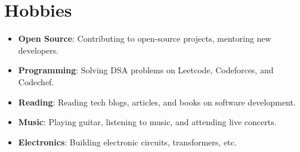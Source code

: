 \documentclass[letterpaper,1pt]{article}
\begin{document}
\section{Hobbies}
\begin{itemize}[leftmargin=*, itemsep=1pt, parsep=0pt]
      \selectfont\small
      \setlength\itemsep{0em}
      \setlength\parsep{0em}
      \item \textbf{Open Source}: \hspace{1.0cm}
            Contributing to open-source projects, mentoring new developers.
      \item \textbf{Programming}: \hspace{0.9cm}
            Solving DSA problems on Leetcode, Codeforces, and Codechef.
      \item \textbf{Reading}: \hspace{1.8cm}
            Reading tech blogs, articles, and books on software development.
      \item \textbf{Music}: \hspace{2.1cm}
            Playing guitar, listening to music, and attending live concerts.
      \item \textbf{Electronics}: \hspace{1.3cm}
            Building electronic circuits, transformers, etc.
\end{itemize}
\end{document}
